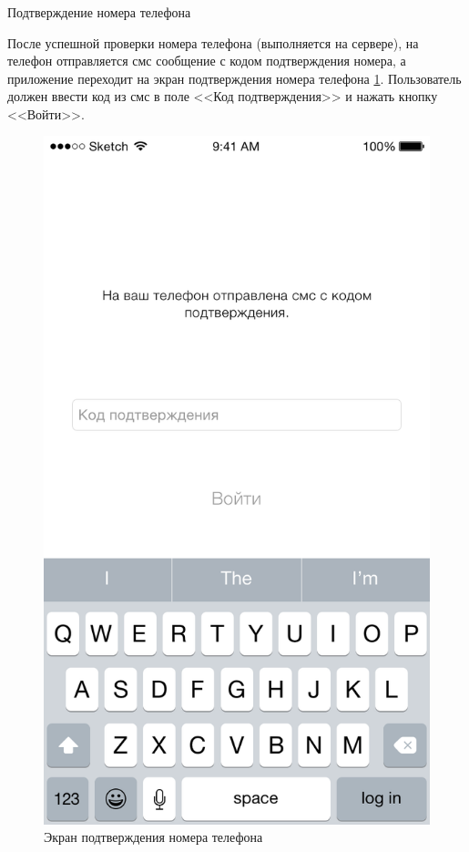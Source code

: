 \subsubsection{} Подтверждение номера телефона
\label{sec:usage:auth:sms}

После успешной проверки номера телефона (выполняется на сервере), на телефон отправляется смс сообщение с кодом подтверждения номера, а приложение переходит на экран подтверждения номера телефона \ref{sec:usage:auth:sms:confirm}. Пользователь должен ввести код из смс в поле <<Код подтверждения>> и нажать кнопку <<Войти>>.

\begin{figure}[h]
  \centering
    \includegraphics[height=0.25\textheight]{inc/img/ui/sms_not_entered.png}
  \caption{Экран подтверждения номера телефона}
  \label{sec:usage:auth:sms:confirm}
\end{figure}